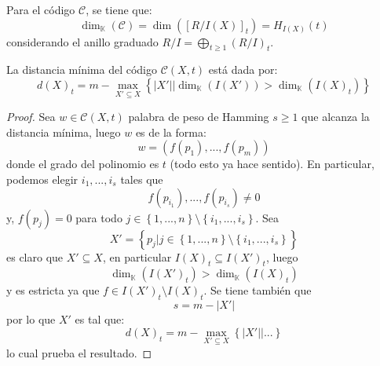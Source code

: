 \documentclass[12pt]{report}
\theoremstyle{largebreak}
\newcommand\abs[1]{\ensuremath{\left|#1\right|}}
\begin{document}
    Para el código $\mathcal{C}$, se tiene que:
    \begin{equation*}
        \dim_{\mathbb{K}}(\mathcal{C})=\dim\left([R/I(X)]_t \right)=H_{ I(X)}(t)
    \end{equation*}
    considerando el anillo graduado $R/I=\bigoplus_{ t\geq1}(R/I)_t$.

    \begin{propo}
        La distancia mínima del código $\mathcal{C}(X,t)$ está dada por:
        \begin{equation*}
            d(X)_t=m-\max_{ X'\subseteq X}\left\{\abs{X'}\Big|\dim_{\mathbb{K}}(I(X'))>\dim_{\mathbb{K}}(I(X)_t) \right\}
        \end{equation*}
    \end{propo}

    \begin{proof}
        Sea $w\in\mathcal{C}(X,t)$ palabra de peso de Hamming $s\geq1$ que alcanza la distancia mínima, luego $w$ es de la forma:
        \begin{equation*}
            w=(f(p_1),...,f(p_m))
        \end{equation*}
        donde el grado del polinomio es $t$ (todo esto ya hace sentido). En particular, podemos elegir $i_1,...,i_s$ tales que
        \begin{equation*}
            f(p_{ i_1}),...,f(p_{ i_s})\neq0
        \end{equation*}
        y, $f(p_j)=0$ para todo $j\in\left\{1,...,n \right\}\setminus\left\{i_1,...,i_s \right\}$. Sea
        \begin{equation*}
            X'=\left\{p_j\Big|j\in\left\{1,...,n \right\}\setminus\left\{i_1,...,i_s \right\}\right\}
        \end{equation*}
        es claro que $X'\subseteq X$, en particular $I(X)_t\subseteq I(X')_t$, luego
        \begin{equation*}
            \dim_{\mathbb{K}}(I(X')_t)>\dim_{\mathbb{K}}(I(X)_t)
        \end{equation*}
        y es estricta ya que $f\in I(X')_t\setminus I(X)_t$. Se tiene también que
        \begin{equation*}
            s=m-\abs{X'}
        \end{equation*}
        por lo que $X'$ es tal que:
        \begin{equation*}
            d(X)_t=m-\max_{ X'\subseteq X}\left\{\abs{X'}\Big|... \right\}
        \end{equation*}
        lo cual prueba el resultado.
    \end{proof}
\end{document}
